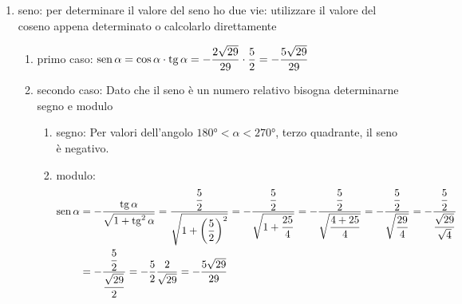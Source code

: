 \begin{table}[H]
\begin{enumerate}
\begin{enumerate}
\begin{enumerate}
		\end{enumerate}
		\item seno: per determinare il valore del seno ho due vie: utilizzare il valore del coseno appena determinato o calcolarlo direttamente 
		\begin{enumerate}
			\item primo caso: $\operatorname{sen}\alpha=\cos\alpha\cdot\operatorname{tg}\alpha=-\dfrac{2\sqrt{29}}{29}\cdot\dfrac{5}{2}=-\dfrac{5\sqrt{29}}{29}$
			\item secondo caso: Dato che il seno è un numero relativo bisogna determinarne segno e modulo
			\begin{enumerate}
				\item segno:  Per valori dell'angolo  $\ang{180}<\alpha<\ang{270}$, terzo quadrante, il seno è negativo.
				\item modulo:
				\begin{align*}
				\operatorname{sen}\alpha&=-\dfrac{\operatorname{tg}\alpha}{\sqrt{1+\operatorname{tg}^2\alpha}}
				=\dfrac{\dfrac{5}{2}}{\sqrt{1+\left(\dfrac{5}{2}\right)^2}}
				=-\dfrac{\dfrac{5}{2}}{\sqrt{1+\dfrac{25}{4}}}
				=-\dfrac{\dfrac{5}{2}}{\sqrt{\dfrac{4+25}{4}}}
				=-\dfrac{\dfrac{5}{2}}{\sqrt{\dfrac{29}{4}}}
				=-\dfrac{\dfrac{5}{2}}{\dfrac{\sqrt{29}}{\sqrt{4}}}\\
				&=-\dfrac{\dfrac{5}{2}}{\dfrac{\sqrt{29}}{2}}
				=-\dfrac{5}{2}\dfrac{2}{\sqrt{29}}
				=-\dfrac{5\sqrt{29}}{29}
				\end{align*} %
			\end{enumerate}
		\end{enumerate}
	\end{enumerate}
\end{enumerate}
\end{table}

